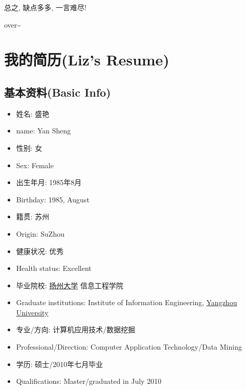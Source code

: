 \documentclass[letterpaper,10pt,english]{manual}
\begin{document}
总之, 缺点多多, 一言难尽!

over\textasciitilde{}

\resetcurrentobjects


\chapter{我的简历(Liz's Resume)}


\section{基本资料(Basic Info)}
\begin{itemize}
\item {} 
姓名: 盛艳

\item {} 
name: Yan Sheng

\item {} 
性别: 女

\item {} 
Sex: Female

\item {} 
出生年月: 1985年8月

\item {} 
Birthday: 1985, August

\item {} 
籍贯: 苏州

\item {} 
Origin: SuZhou

\item {} 
健康状况: 优秀

\item {} 
Health status: Excellent

\item {} 
毕业院校: \href{http://www.yzu.edu.cn}{扬州大学} 信息工程学院

\item {} 
Graduate institutions: Institute of Information Engineering, \href{http://www.yzu.edu.cn}{Yangzhou University}

\item {} 
专业/方向: 计算机应用技术/数据挖掘

\item {} 
Professional/Direction: Computer Application Technology/Data Mining

\item {} 
学历: 硕士/2010年七月毕业

\item {} 
Qualifications: Master/graduated in July 2010


\end{itemize}
\end{document}
